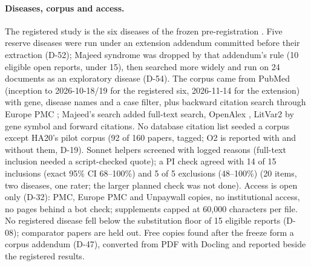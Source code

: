 \documentclass{article} %
\begin{document}
\paragraph{Diseases, corpus and access.} The registered study is the six diseases of the frozen pre-registration \citep{elhani2024_ha20_177,didiasova2020_ssadh_update,koseki2021_tangier_review,almarzanovoa2018_lad1_review,brambatti2019_danon_gender}. Five reserve diseases \citep{wouters2014_blau,vitali2022_lcat,stockleripsiroglu2014_gamt,beyens2018_ats,hajialigol2022_papa} were run under an extension addendum committed before their extraction (D-52); Majeed syndrome \citep{ferguson2021_majeed} was dropped by that addendum's rule (10 eligible open reports, under 15), then searched more widely and run on 24 documents as an exploratory disease (D-54). The corpus came from PubMed (inception to 2026-10-18/19 for the registered six, 2026-11-14 for the extension) with gene, disease names and a case filter, plus backward citation search through Europe PMC \citep{Rosonovski2023EuropePmc}; Majeed's search added full-text search, OpenAlex \citep{Priem2022OpenalexFullyopen}, LitVar2 by gene symbol and forward citations. No database citation list seeded a corpus except HA20's pilot corpus (92 of 160 papers, tagged; O2 is reported with and without them, D-19). Sonnet helpers screened with logged reasons (full-text inclusion needed a script-checked quote); a PI check agreed with 14 of 15 inclusions (exact 95\% CI 68--100\%) and 5 of 5 exclusions (48--100\%) (20 items, two diseases, one rater; the larger planned check was not done). Access is open only (D-32): PMC, Europe PMC and Unpaywall copies, no institutional access, no pages behind a bot check; supplements capped at 60,000 characters per file. No registered disease fell below the substitution floor of 15 eligible reports (D-08); comparator papers are held out. Free copies found after the freeze form a corpus addendum (D-47), converted from PDF with Docling \citep{Auer2024DoclingTechnical} and reported beside the registered results.
\end{document}
